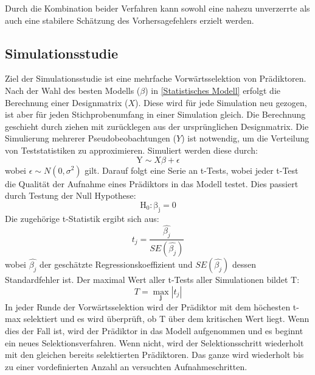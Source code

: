 Durch die Kombination beider Verfahren kann sowohl eine nahezu unverzerrte als auch eine stabilere Schätzung des Vorhersagefehlers erzielt werden.

\subsection{Simulationsstudie}

Ziel der Simulationsstudie ist eine mehrfache Vorwärtsselektion von Prädiktoren. Nach der Wahl des besten Modells ($\beta$) in
\ref{Statistisches Modell} erfolgt die Berechnung einer Designmatrix ($X$). Diese wird für jede Simulation neu gezogen, ist aber
für jeden Stichprobenumfang in einer Simulation gleich. Die Berechnung geschieht durch ziehen mit zurücklegen aus der ursprünglichen
Designmatrix. Die Simulierung mehrerer Pseudobeobachtungen ($Y$) ist notwendig, um die Verteilung von Teststatistiken zu approximieren.
Simuliert werden diese durch:\\
\begin{equation}
\mathrm{Y} \sim X\beta + \epsilon
\end{equation}
wobei $\epsilon \sim N(0,\sigma^2)$ gilt. Darauf folgt eine Serie an t-Tests, wobei jeder t-Test die Qualität der Aufnahme eines
Prädiktors in das Modell testet. Dies passiert durch Testung der Null Hypothese:\\
\begin{equation}
\mathrm{H_0 : \beta_j}  = 0 
\end{equation}
Die zugehörige t-Statistik \cite{kim2015t, harrell2001} ergibt sich aus: 
\begin{equation} \label{Einstichprobentest}
t_{j} = \frac{\hat{\beta_{j}}}{SE(\hat{\beta_{j}})}
\end{equation}
wobei $\hat{\beta_{j}}$ der geschätzte Regressionskoeffizient und $SE(\hat{\beta_{j}})$ dessen Standardfehler ist. Der maximal Wert aller t-Tests aller Simulationen bildet T:
\begin{equation}
T = \mathop{max}_{\textbf{j}}|t_j|
\end{equation}
In jeder Runde der Vorwärtsselektion wird der Prädiktor mit dem höchesten t-max selektiert und es wird überprüft, ob T über dem
kritischen Wert liegt. Wenn dies der Fall ist, wird der Prädiktor in das Modell aufgenommen und es beginnt ein neues
Selektionsverfahren. Wenn nicht, wird der Selektionsschritt wiederholt mit den gleichen bereits selektierten Prädiktoren. Das
ganze wird wiederholt bis zu einer vordefinierten Anzahl an versuchten Aufnahmeschritten. 

